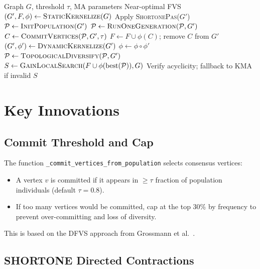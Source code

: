 \documentclass[10pt,a4paper]{report}
\theoremstyle{definition}
\begin{document}
\begin{algorithm}[H]
	\caption{DKMA: Dynamic Kernelized Memetic Algorithm}
	\label{alg:dkma}
	\begin{algorithmic}[1]
		\Require Graph $G$, threshold $\tau$, MA parameters
		\Ensure Near-optimal FVS
		\State $(G', F, \phi) \leftarrow \textsc{StaticKernelize}(G)$
		 Apply \textsc{ShortonePas}($G'$) \EndIf
		\State $\mathcal{P} \leftarrow \textsc{InitPopulation}(G')$
		\Repeat
		\State $\mathcal{P} \leftarrow \textsc{RunOneGeneration}(\mathcal{P}, G')$
		\State $C \leftarrow \textsc{CommitVertices}(\mathcal{P}, G', \tau)$ 
		\State $F \leftarrow F \cup \phi(C)$; remove $C$ from $G'$
		\State $(G', \phi') \leftarrow \textsc{DynamicKernelize}(G')$ 
		\State $\phi \leftarrow \phi \circ \phi'$
		 $\mathcal{P} \leftarrow \textsc{TopologicalDiversify}(\mathcal{P}, G')$ \EndIf
		\State $S \leftarrow \textsc{GainLocalSearch}(F \cup \phi(\text{best}({\mathcal{P}})), G)$ 
		\State Verify acyclicity; fallback to KMA if invalid
		\Return $S$
	\end{algorithmic}
\end{algorithm}

\section{Key Innovations}

\subsection{Commit Threshold and Cap}

The function \texttt{\_commit\_vertices\_from\_population} selects consensus vertices:
\begin{itemize}
	\item A vertex $v$ is committed if it appears in $\geq \tau$ fraction of population individuals (default $\tau = 0.8$).
	\item If too many vertices would be committed, cap at the top 30\% by frequency to prevent over-committing and loss of diversity.
\end{itemize}
This is based on the DFVS approach from Grossmann et al.\ \cite{grossmann2022ipec}.

\subsection{SHORTONE Directed Contractions}
\end{document}
